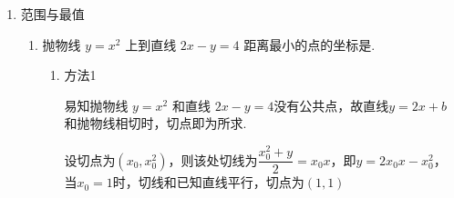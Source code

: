 \begin{enumerate}
\begin{enumerate}
\begin{jieda}
\begin{enumerate}
                \item 切线 ${AP}$ 的方程为 $y - \dfrac{{x}_{1}^{2}}{4} = \dfrac{1}{2}{x}_{1}\left( {x - {x}_{1}}\right)$ ,即 $y = \dfrac{{x}_{1}x}{2} - \dfrac{{x}_{1}^{2}}{4}$ ,切线 ${BP}$ 的方程为 $y = \dfrac{{x}_{2}x}{2} - \dfrac{{x}_{2}^{2}}{4}$
                
                联立两切线方程 $\left\{  \begin{array}{l} y = \dfrac{{x}_{1}x}{2} - \dfrac{{x}_{1}^{2}}{4} \\  y = \dfrac{{x}_{2}x}{2} - \dfrac{{x}_{2}^{2}}{4} \end{array}\right.$ ,解得 $\left\{  \begin{array}{l} x = \dfrac{{x}_{1} + {x}_{2}}{2} = {2k} \\  y = \dfrac{{x}_{1}{x}_{2}}{4} =  - 1 \end{array}\right.$ ,即 $P\left( {{2k}, - 1}\right)$ .
                
                由 ${k}_{PA} \cdot  {k}_{PB} = \dfrac{{x}_{1}}{2}\dfrac{{x}_{2}}{2} = \dfrac{{x}_{1}{x}_{2}}{4} =  - 1$ 得 ${PA} \bot  {PB}$ ,故 $N$ 是 ${AB}$ 的中点，而 ${y}_{1} + {y}_{2} = k\left( {{x}_{1} + {x}_{2}}\right)  + 2 = 4{k}^{2} + 2,{y}_{1}{y}_{2} = \dfrac{{x}_{1}^{2}}{4} \cdot  \dfrac{{x}_{2}^{2}}{4} = 1$，由中点坐标公式得 $N\left( {{2k},2{k}^{2} + 1}\right)$ 
                
                故 $\vv{PF} = \left( {-{2k},2}\right) ,\vv{PN} = \left( {0,2{k}^{2} + 2}\right) ,\vv{AB} = \left( {{x}_{2} - {x}_{1},{y}_{2} - {y}_{1}}\right)$，$\vv{PF} \cdot  \vv{PN} = 4{k}^{2} + 4 \geq  4$，当且仅当 $k = 0$ 时等号成立,故 $\vv{PF} \cdot  \vv{PN}$ 的最小值是 4 .
            \end{enumerate}
        \end{jieda}
    \end{enumerate}
    \item 范围与最值
    \begin{enumerate}
        \item 抛物线 $y = {x}^{2}$ 上到直线 ${2x} - y = 4$ 距离最小的点的坐标是.
        \begin{jieda}
            \begin{enumerate}
                \item 方法1
    
                易知抛物线 $y = {x}^{2}$ 和直线 ${2x} - y = 4$没有公共点，故直线$y = 2x+b$和抛物线相切时，切点即为所求.
    
                设切点为$(x_0, x_0^2)$，则该处切线为$\dfrac{x_0^2+y}{2} = x_0x$，即$y = 2x_0x-x_0^2$，当$x_0 = 1$时，切线和已知直线平行，切点为$(1, 1)$
    

\end{enumerate}
\end{jieda}
\end{enumerate}
\end{enumerate}
